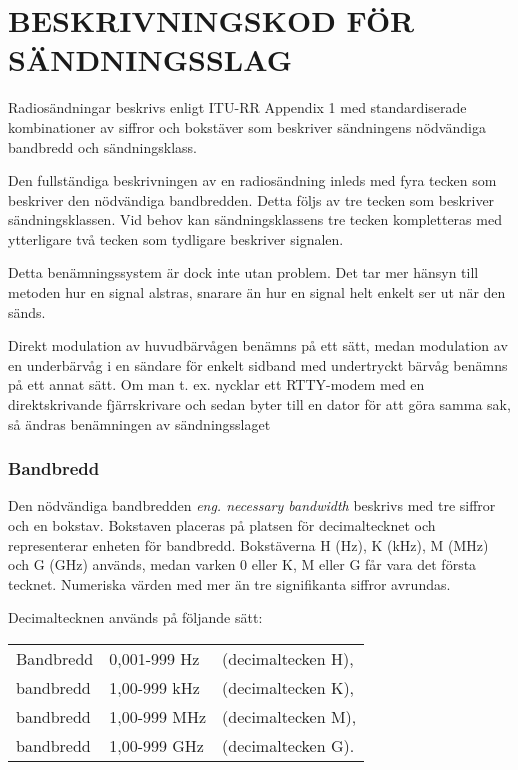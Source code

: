 \chapter{BESKRIVNINGSKOD FÖR SÄNDNINGSSLAG}


Radiosändningar beskrivs enligt ITU-RR Appendix 1 med standardiserade
kombinationer av siffror och bokstäver som beskriver sändningens nödvändiga
bandbredd och sändningsklass. 

Den fullständiga beskrivningen av en radiosändning inleds med fyra tecken
som beskriver den nödvändiga bandbredden. Detta följs av tre tecken som
beskriver sändningsklassen. Vid behov kan sändningsklassens tre tecken
kompletteras med ytterligare två tecken som tydligare beskriver signalen.

Detta benämningssystem är dock inte utan problem. Det tar mer hänsyn till
metoden hur en signal alstras, snarare än hur en signal helt enkelt ser ut när
den sänds.

Direkt modulation av huvudbärvågen benämns på ett sätt, medan modulation
av en underbärvåg i en sändare för enkelt sidband med undertryckt bärvåg
benämns på ett annat sätt. Om man t. ex. nycklar ett RTTY-modem med en
direktskrivande fjärrskrivare och sedan byter till en dator för att göra samma
sak, så ändras benämningen av sändningsslaget

\subsection{Bandbredd}

Den nödvändiga bandbredden \emph{eng. necessary bandwidth} beskrivs med
tre siffror och en bokstav. Bokstaven placeras på platsen för decimaltecknet
och representerar enheten för bandbredd. Bokstäverna H (Hz), K (kHz), M (MHz)
och G (GHz) används, medan varken 0 eller K, M eller G får vara det första
tecknet. Numeriska värden med mer än tre signifikanta siffror avrundas.

Decimaltecknen används på följande sätt:\\
\begin{tabular}{lll}
	Bandbredd & 0,001-999 Hz & (decimaltecken H),\\
	bandbredd & 1,00-999 kHz & (decimaltecken K),\\
	bandbredd & 1,00-999 MHz & (decimaltecken M),\\
	bandbredd & 1,00-999 GHz & (decimaltecken G).\\
\end{tabular}

